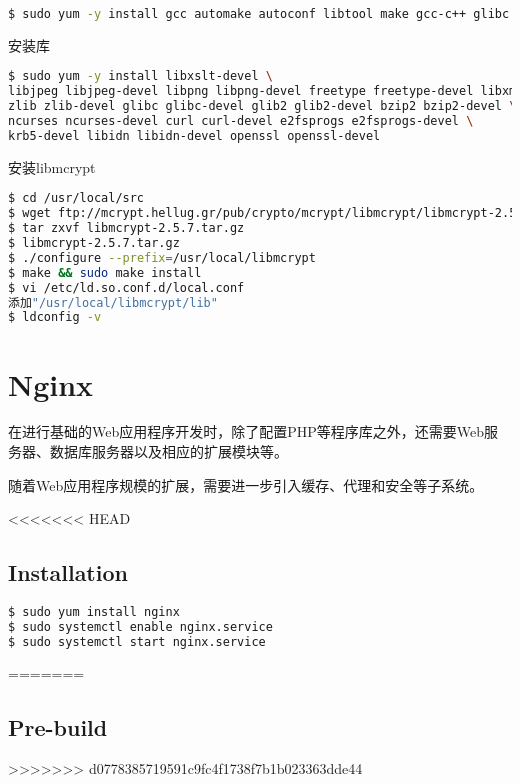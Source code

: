 \begin{lstlisting}[language=bash]
$ sudo yum -y install gcc automake autoconf libtool make gcc-c++ glibc
\end{lstlisting}

安装库


\begin{lstlisting}[language=bash]
$ sudo yum -y install libxslt-devel \
libjpeg libjpeg-devel libpng libpng-devel freetype freetype-devel libxml2 libxml2-devel \
zlib zlib-devel glibc glibc-devel glib2 glib2-devel bzip2 bzip2-devel \
ncurses ncurses-devel curl curl-devel e2fsprogs e2fsprogs-devel \
krb5-devel libidn libidn-devel openssl openssl-devel
\end{lstlisting}

安装libmcrypt


\begin{lstlisting}[language=bash]
$ cd /usr/local/src
$ wget ftp://mcrypt.hellug.gr/pub/crypto/mcrypt/libmcrypt/libmcrypt-2.5.7.tar.gz
$ tar zxvf libmcrypt-2.5.7.tar.gz
$ libmcrypt-2.5.7.tar.gz
$ ./configure --prefix=/usr/local/libmcrypt
$ make && sudo make install
$ vi /etc/ld.so.conf.d/local.conf
添加"/usr/local/libmcrypt/lib"
$ ldconfig -v
\end{lstlisting}





\section{Nginx}



在进行基础的Web应用程序开发时，除了配置PHP等程序库之外，还需要Web服务器、数据库服务器以及相应的扩展模块等。

随着Web应用程序规模的扩展，需要进一步引入缓存、代理和安全等子系统。


<<<<<<< HEAD


\subsection{Installation}


\begin{lstlisting}[language=bash]
$ sudo yum install nginx
$ sudo systemctl enable nginx.service
$ sudo systemctl start nginx.service
\end{lstlisting}
=======
\subsection{Pre-build}
>>>>>>> d0778385719591c9fc4f1738f7b1b023363dde44

